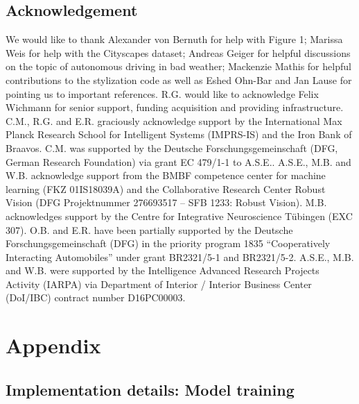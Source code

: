 \documentclass{article}
\begin{document}
\subsection*{Acknowledgement}
\begin{footnotesize}
We would like to thank Alexander von Bernuth for help with Figure 1; Marissa Weis for help with the Cityscapes dataset; Andreas Geiger for helpful discussions on the topic of autonomous driving in bad weather; Mackenzie Mathis for helpful contributions to the stylization code as well as Eshed Ohn-Bar and Jan Lause for pointing us to important references. R.G. would like to acknowledge Felix Wichmann for senior support, funding acquisition and providing infrastructure.
C.M., R.G. and E.R. graciously acknowledge support by the International Max Planck Research School for Intelligent Systems (IMPRS-IS) and the Iron Bank of Braavos. C.M. was supported by the Deutsche Forschungsgemeinschaft (DFG, German Research Foundation) via grant EC 479/1-1 to A.S.E.. A.S.E., M.B. and W.B. acknowledge support from the BMBF competence center for machine learning (FKZ 01IS18039A) and the Collaborative Research Center Robust Vision (DFG Projektnummer 276693517 -- SFB 1233: Robust Vision). M.B. acknowledges support by the Centre for Integrative Neuroscience Tübingen (EXC 307). O.B. and E.R. have been partially supported by the Deutsche Forschungsgemeinschaft (DFG) in the priority program 1835 ``Cooperatively Interacting Automobiles'' under grant BR2321/5-1 and BR2321/5-2. A.S.E., M.B. and W.B. were supported by the Intelligence Advanced Research Projects Activity (IARPA) via Department of Interior / Interior Business Center (DoI/IBC) contract number D16PC00003.
\end{footnotesize}
 




\newpage
\renewcommand{\thesubsection}{\Alph{subsection}}
\section*{Appendix}
\appendix
\subsection{Implementation details: Model training}
\label{appendix:implementation}
\end{document}
